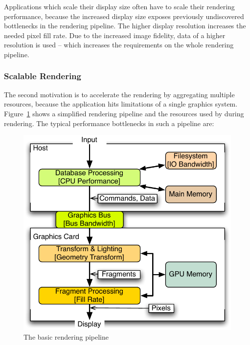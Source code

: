 \documentclass[10pt,a4paper]{scrartcl}
\begin{document}
Applications which scale their display size often have to scale
their rendering performance, because the increased display size exposes
previously undiscovered bottlenecks in the rendering pipeline. The higher
display resolution increases the needed pixel fill rate. Due to the increased
image fidelity, data of a higher resolution is used -- which increases
the requirements on the whole rendering pipeline.

\subsubsection{Scalable Rendering}
The second motivation is to accelerate the rendering by aggregating
multiple resources, because the application hits limitations of a single
graphics system. Figure~\ref{FIG_pipeline} shows a simplified rendering
pipeline and the resources used by during rendering. The typical
performance bottlenecks in such a pipeline are:

\begin{figure}[htb]
\centering
\includegraphics[width=0.45\columnwidth]{images/pipeline.pdf}
\caption{The basic rendering pipeline}
\label{FIG_pipeline}
\end{figure}
\end{document}
